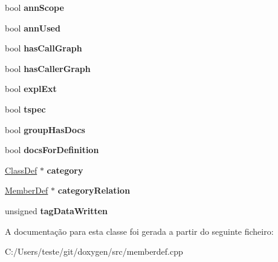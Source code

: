 \begin{DoxyCompactItemize}
\item 
\hypertarget{class_member_def_impl_a0bda62ad15f8efc088de1e423aac1029}{bool {\bfseries ann\-Scope}}\label{class_member_def_impl_a0bda62ad15f8efc088de1e423aac1029}

\item 
\hypertarget{class_member_def_impl_a62ad188b2795bc50b7a973052dc6a419}{bool {\bfseries ann\-Used}}\label{class_member_def_impl_a62ad188b2795bc50b7a973052dc6a419}

\item 
\hypertarget{class_member_def_impl_aa6b9c5746da214120c1c05d3f3388555}{bool {\bfseries has\-Call\-Graph}}\label{class_member_def_impl_aa6b9c5746da214120c1c05d3f3388555}

\item 
\hypertarget{class_member_def_impl_aff5654f9e83ca62661a63d704cd45487}{bool {\bfseries has\-Caller\-Graph}}\label{class_member_def_impl_aff5654f9e83ca62661a63d704cd45487}

\item 
\hypertarget{class_member_def_impl_aad4291b6a97209ba1b314cf1bd627b75}{bool {\bfseries expl\-Ext}}\label{class_member_def_impl_aad4291b6a97209ba1b314cf1bd627b75}

\item 
\hypertarget{class_member_def_impl_a8ea64174a54e96d4876ca69dc2bceacd}{bool {\bfseries tspec}}\label{class_member_def_impl_a8ea64174a54e96d4876ca69dc2bceacd}

\item 
\hypertarget{class_member_def_impl_a69c8f731eadc0ce0ec06d3ddb7143a4d}{bool {\bfseries group\-Has\-Docs}}\label{class_member_def_impl_a69c8f731eadc0ce0ec06d3ddb7143a4d}

\item 
\hypertarget{class_member_def_impl_aa32967e84cf87f2da11dd6548bcadce5}{bool {\bfseries docs\-For\-Definition}}\label{class_member_def_impl_aa32967e84cf87f2da11dd6548bcadce5}

\item 
\hypertarget{class_member_def_impl_a7c44d0e8f021ffb55bc7f40700c06b53}{\hyperlink{class_class_def}{Class\-Def} $\ast$ {\bfseries category}}\label{class_member_def_impl_a7c44d0e8f021ffb55bc7f40700c06b53}

\item 
\hypertarget{class_member_def_impl_ab05716e92e6286f98f6ad3e5e44c483e}{\hyperlink{class_member_def}{Member\-Def} $\ast$ {\bfseries category\-Relation}}\label{class_member_def_impl_ab05716e92e6286f98f6ad3e5e44c483e}

\item 
\hypertarget{class_member_def_impl_a9c34a92f90392b36ffde0ba21b0bae2f}{unsigned {\bfseries tag\-Data\-Written}}\label{class_member_def_impl_a9c34a92f90392b36ffde0ba21b0bae2f}

\end{DoxyCompactItemize}


A documentação para esta classe foi gerada a partir do seguinte ficheiro\-:\begin{DoxyCompactItemize}
\item 
C\-:/\-Users/teste/git/doxygen/src/memberdef.\-cpp\end{DoxyCompactItemize}
